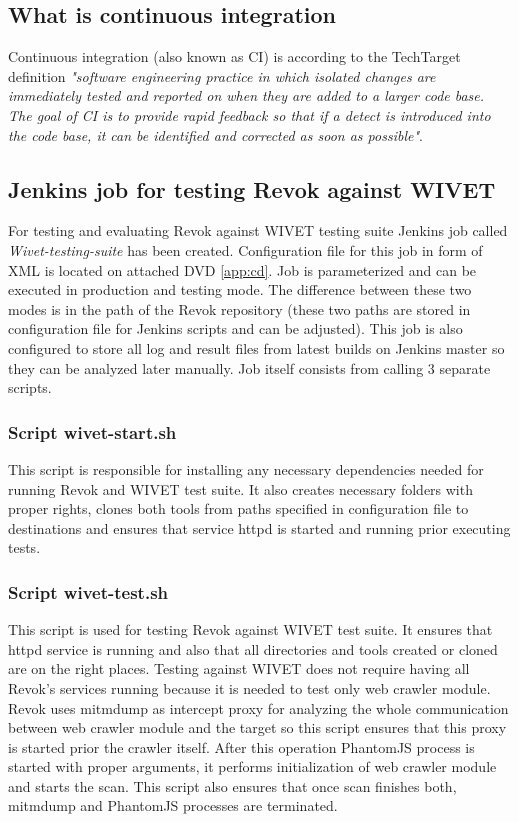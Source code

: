 		\subsection{What is continuous integration}
			
		Continuous integration (also known as CI) is according to the TechTarget definition \cite{CI-definition} \emph{"software engineering practice in which isolated changes are immediately tested and reported on when they are added to a larger code base. The goal of CI is to provide rapid feedback so that if a detect is introduced into the code base, it can be identified and corrected as soon as possible"}.
		
		\subsection{Jenkins job for testing Revok against WIVET}
		
		For testing and evaluating Revok against WIVET testing suite Jenkins job called \textit{Wivet-testing-suite} has been created. Configuration file for this job in form of XML is located on attached DVD \ref{app:cd}. Job is parameterized and can be executed in production and testing mode. The difference between these two modes is in the path of the Revok repository (these two paths are stored in configuration file for Jenkins scripts and can be adjusted). This job is also configured to store all log and result files from latest builds on Jenkins master so they can be analyzed later manually. Job itself consists from calling 3 separate scripts.
		
			\subsubsection{Script wivet-start.sh}
			
			This script is responsible for installing any necessary dependencies needed for running Revok and WIVET test suite. It also creates necessary folders with proper rights, clones both tools from paths specified in configuration file to destinations and ensures that service httpd is started and running prior executing tests.
			
			\subsubsection{Script wivet-test.sh}
			
			This script is used for testing Revok against WIVET test suite. It ensures that httpd service is running and also that all directories and tools created or cloned are on the right places. 
			Testing against WIVET does not require having all Revok's services running because it is needed to test only web crawler module. Revok uses mitmdump \cite{mitmdump} as intercept proxy for analyzing the whole communication between web crawler module and the target so this script ensures that this proxy is started prior the crawler itself. After this operation PhantomJS process is started with proper arguments, it performs initialization of web crawler module and starts the scan. This script also ensures that once scan finishes both, mitmdump and PhantomJS processes are terminated.
			
